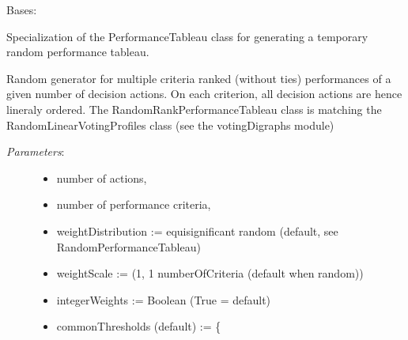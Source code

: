 \documentclass[letterpaper,10pt,english]{sphinxmanual}
\begin{document}

\begin{fulllineitems}
\label{techDoc:randomPerfTabs.RandomRankPerformanceTableau}
Bases: {\hyperref[techDoc:perfTabs.PerformanceTableau]{\emph{}}}

Specialization of the PerformanceTableau class for generating a temporary
random performance tableau.

Random generator for multiple criteria ranked (without ties) performances of a
given number of decision actions. On each criterion,
all decision actions are hence lineraly ordered. The RandomRankPerformanceTableau class is
matching the RandomLinearVotingProfiles class (see the votingDigraphs module)
\begin{description}
\item[{\emph{Parameters}:}] \leavevmode\begin{itemize}
\item {} 
number of actions,

\item {} 
number of performance criteria,

\item {} 
weightDistribution := equisignificant \textbar{} random (default, see RandomPerformanceTableau)

\item {} 
weightScale := (1, 1 \textbar{} numberOfCriteria (default when random))

\item {} 
integerWeights := Boolean (True = default)

\item {} \begin{description}
\item[{commonThresholds (default) := \{}] \leavevmode
{}

\end{description}

\end{itemize}

\end{description}

\end{fulllineitems}
\end{document}
